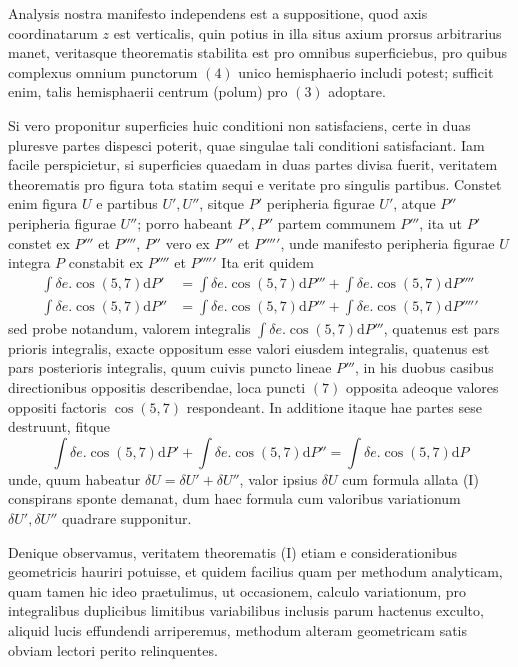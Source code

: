 Analysis nostra manifesto independens est a suppositione, quod axis coordinatarum $z$ est verticalis, quin potius in illa situs axium prorsus arbitrarius manet, veritasque theorematis stabilita est pro omnibus superficiebus, pro quibus complexus omnium punctorum $(4)$ unico hemisphaerio includi potest; sufficit enim, talis hemisphaerii centrum (polum) pro $(3)$ adoptare.

Si vero proponitur superficies huic conditioni non satisfaciens, certe in duas pluresve partes dispesci poterit, quae singulae tali conditioni satisfaciant. Iam facile perspicietur, si superficies quaedam in duas partes divisa fuerit, veritatem theorematis pro figura tota statim sequi e veritate pro singulis partibus. Constet enim figura $U$ e partibus $U',U''$, sitque $P'$ peripheria figurae $U'$, atque $P''$ peripheria figurae $U''$; porro habeant $P',P''$ partem communem $P'''$, ita ut $P'$ constet ex $P'''$ et $P''''$, $P''$ vero ex $P'''$ et $P'''''$, unde manifesto peripheria figurae $U$ integra $P$ constabit ex $P''''$ et $P'''''$ Ita erit quidem
\[
\begin{aligned}
\int\delta e.\cos(5,7)\mathrm{d}P'&=\int\delta e.\cos(5,7)\mathrm{d}P'''+\int\delta e.\cos(5,7)\mathrm{d}P''''\\
\int\delta e.\cos(5,7)\mathrm{d}P''&=\int\delta e.\cos(5,7)\mathrm{d}P'''+\int\delta e.\cos(5,7)\mathrm{d}P'''''
\end{aligned}
\]
sed probe notandum, valorem integralis $\int\delta e.\cos(5,7)\mathrm{d}P'''$, quatenus est pars prioris integralis, exacte oppositum esse valori eiusdem integralis, quatenus est pars posterioris integralis, quum cuivis puncto lineae $P'''$, in his duobus casibus directionibus oppositis describendae, loca puncti $(7)$ opposita adeoque valores oppositi factoris $\cos(5,7)$ respondeant. In additione itaque hae partes sese destruunt, fitque
\[
\int\delta e.\cos(5,7)\mathrm{d}P'+\int\delta e.\cos(5,7)\mathrm{d}P''=\int\delta e.\cos(5,7)\mathrm{d}P
\]
unde, quum habeatur $\delta U=\delta U'+\delta U''$, valor ipsius $\delta U$ cum formula allata (I) conspirans sponte demanat, dum haec formula cum valoribus variationum $\delta U',\delta U''$ quadrare supponitur.

Denique observamus, veritatem theorematis (I) etiam e considerationibus geometricis hauriri potuisse, et quidem facilius quam per methodum analyticam, quam tamen hic ideo praetulimus, ut occasionem, calculo variationum, pro integralibus duplicibus limitibus variabilibus inclusis parum hactenus exculto, aliquid lucis effundendi arriperemus, methodum alteram geometricam satis obviam lectori perito relinquentes.

